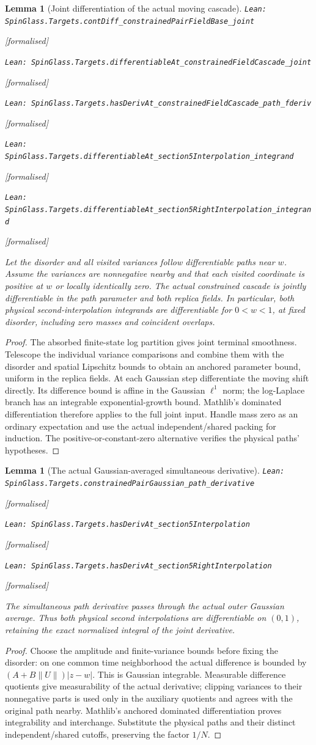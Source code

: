 \documentclass[11pt]{article}
\providecommand{\lean}[1]{\leavevmode\par\nopagebreak
  {\noindent\normalfont\footnotesize\raggedright\texttt{Lean: #1}\par}\nopagebreak}
\providecommand{\leanok}{\par\nopagebreak
  {\noindent\normalfont\footnotesize\textcolor{green!50!black}{[formalised]}\par}\nopagebreak}
\newtheorem{lemma}[theorem]{Lemma}
\begin{document}
\begin{lemma}[Joint differentiation of the actual moving cascade]
\lean{SpinGlass.Targets.contDiff\_constrainedPairFieldBase\_joint}\leanok
\lean{SpinGlass.Targets.differentiableAt\_constrainedFieldCascade\_joint}\leanok
\lean{SpinGlass.Targets.hasDerivAt\_constrainedFieldCascade\_path\_fderiv}\leanok
\lean{SpinGlass.Targets.differentiableAt\_section5Interpolation\_integrand}\leanok
\lean{SpinGlass.Targets.differentiableAt\_section5RightInterpolation\_integrand}\leanok
Let the disorder and all visited variances follow differentiable paths near
$w$. Assume the variances are nonnegative nearby and that each visited
coordinate is positive at $w$ or locally identically zero. The actual
constrained cascade is jointly differentiable in the path parameter and both
replica fields. In particular, both physical second-interpolation integrands
are differentiable for $0<w<1$, at fixed disorder, including zero masses and
coincident overlaps.
\end{lemma}
\begin{proof}
The absorbed finite-state log partition gives joint terminal smoothness.
Telescope the individual variance comparisons and combine them with the
disorder and spatial Lipschitz bounds to obtain an anchored parameter bound,
uniform in the replica fields. At each Gaussian step differentiate the moving
shift directly. Its difference bound is affine in the Gaussian $\ell^1$ norm;
the log-Laplace branch has an integrable exponential-growth bound. Mathlib's
dominated differentiation therefore applies to the full joint input. Handle
mass zero as an ordinary expectation and use the actual independent/shared
packing for induction. The positive-or-constant-zero alternative verifies the
physical paths' hypotheses.
\end{proof}
\begin{lemma}[The actual Gaussian-averaged simultaneous derivative]
\lean{SpinGlass.Targets.constrainedPairGaussian\_path\_derivative}\leanok
\lean{SpinGlass.Targets.hasDerivAt\_section5Interpolation}\leanok
\lean{SpinGlass.Targets.hasDerivAt\_section5RightInterpolation}\leanok
The simultaneous path derivative passes through the actual outer Gaussian
average. Thus both physical second interpolations are differentiable on
$(0,1)$, retaining the exact normalized integral of the joint derivative.
\end{lemma}
\begin{proof}
Choose the amplitude and finite-variance bounds before fixing the disorder:
on one common time neighborhood the actual difference is bounded by
$(A+B\|U\|)|z-w|$. This is Gaussian integrable. Measurable difference quotients
give measurability of the actual derivative; clipping variances to their
nonnegative parts is used only in the auxiliary quotients and agrees with the
original path nearby. Mathlib's anchored dominated differentiation proves
integrability and interchange. Substitute the physical paths and their
distinct independent/shared cutoffs, preserving the factor $1/N$.
\end{proof}
\end{document}
